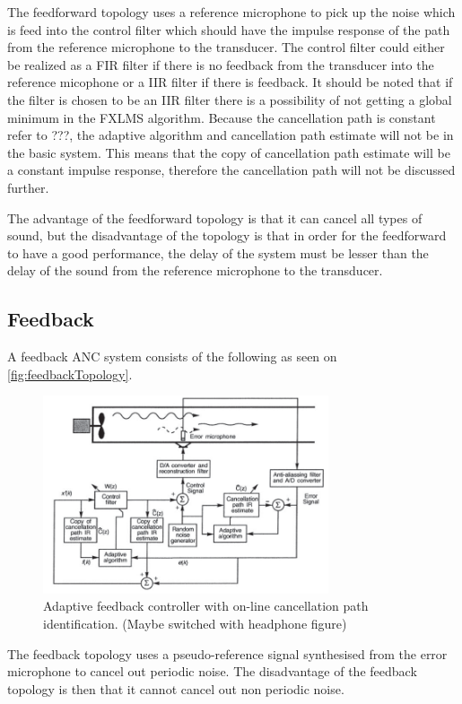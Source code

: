 The feedforward topology uses a reference microphone to pick up the noise which is feed into the control filter which should have the impulse response of the path from the reference microphone to the transducer. The control filter could either be realized as a FIR filter if there is no feedback from the transducer into the reference micophone or a IIR filter if there is feedback. It should be noted that if the filter is chosen to be an IIR filter there is a possibility of not getting a global minimum in the FXLMS algorithm. Because the cancellation path is constant refer to ???, the adaptive algorithm and cancellation path estimate will not be in the basic system. This means that the copy of cancellation path estimate will be a constant impulse response, therefore the cancellation path will not be discussed further. 

The advantage of the feedforward topology is that it can cancel all types of sound, but the disadvantage of the topology is that in order for the feedforward to have a good performance, the delay of the system must be lesser than the delay of the sound from the reference microphone to the transducer.    



\subsection*{Feedback}
A feedback ANC system consists of the following as seen on \autoref{fig:feedbackTopology}.
\begin{figure}[H]
	\centering
	\includegraphics[width=0.75\textwidth]{figures/BasicSystem/feedback}
	\caption{Adaptive feedback controller with on-line cancellation path identification. (Maybe switched with headphone figure)}
	\label{fig:feedbackTopology}
\end{figure}

The feedback topology uses a pseudo-reference signal synthesised from the error microphone to cancel out periodic noise. The disadvantage of the feedback topology is then that it cannot cancel out non periodic noise.    




